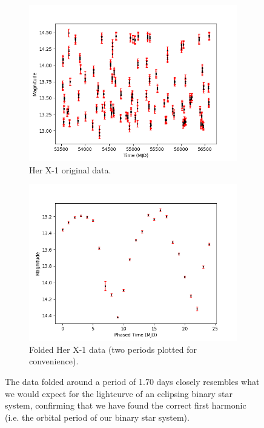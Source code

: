\documentclass[11pt]{article}
\begin{document}
\begin{enumerate}
\begin{figure}[!htbp]
  \begin{subfigure}[b]{0.5\textwidth}
    \includegraphics[width=\textwidth]{her_x-1.png}
    \caption{Her X-1 original data.}
  \end{subfigure}
  \hfill
  \begin{subfigure}[b]{0.5\textwidth}
    \includegraphics[width=\textwidth]{folded_her_x-1.png}
    \caption{Folded Her X-1 data (two periods plotted for convenience).}
  \end{subfigure}
  \caption{The data folded around a period of 1.70 days closely resembles what we would expect for the lightcurve of an eclipsing binary star system, confirming that we have found the correct first harmonic (i.e. the orbital period of our binary star system).}
\end{figure}

\end{enumerate}
\end{document}
